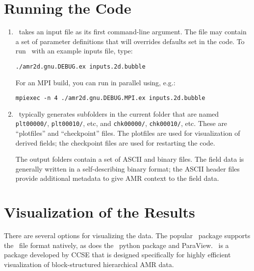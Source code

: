 \section{Running the Code}

\begin{enumerate}

\item \iamr\ takes an input file as its first command-line argument.  The file may
contain a set of parameter definitions that will overrides defaults set in the code.
To run \iamr\ with an example inputs file, type:
\begin{verbatim}
./amr2d.gnu.DEBUG.ex inputs.2d.bubble
\end{verbatim}
For an MPI build, you can run in parallel using, e.g.:
\begin{verbatim}
mpiexec -n 4 ./amr2d.gnu.DEBUG.MPI.ex inputs.2d.bubble
\end{verbatim}

\item \iamr\ typically generates subfolders in the current folder that
  are named {\tt plt00000/}, {\tt plt00010/}, etc, and {\tt chk00000/},
  {\tt chk00010/}, etc. These are ``plotfiles'' and ``checkpoint''
  files. The plotfiles are used for visualization of derived fields; the checkpoint
  files are used for restarting the code.

  The output folders contain a set of ASCII and binary files.  The field
  data is generally written in a self-describing binary format; the 
  ASCII header files provide additional metadata to give AMR context to the field data.

\end{enumerate}

\section{Visualization of the Results}
\label{sec:visBuild}

There are several options for visualizing the data.  The popular
\visit\ package supports the \amrex\ file format natively, as does
the \yt\ python package and ParaView. \amrvis\ is a package developed
by CCSE that is designed specifically for highly efficient visualization
of block-structured hierarchical AMR data.

